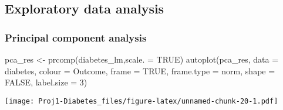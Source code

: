 \documentclass[
]{article}
\newenvironment{Shaded}{\begin{snugshade}}{\end{snugshade}}
\newcommand{\AttributeTok}[1]{\textcolor[rgb]{0.77,0.63,0.00}{#1}}
\newcommand{\ConstantTok}[1]{\textcolor[rgb]{0.00,0.00,0.00}{#1}}
\newcommand{\DecValTok}[1]{\textcolor[rgb]{0.00,0.00,0.81}{#1}}
\newcommand{\FunctionTok}[1]{\textcolor[rgb]{0.00,0.00,0.00}{#1}}
\newcommand{\NormalTok}[1]{#1}
\newcommand{\OtherTok}[1]{\textcolor[rgb]{0.56,0.35,0.01}{#1}}
\newcommand{\StringTok}[1]{\textcolor[rgb]{0.31,0.60,0.02}{#1}}
\begin{document}
\hypertarget{exploratory-data-analysis}{%
\subsection{Exploratory data analysis}\label{exploratory-data-analysis}}

\hypertarget{principal-component-analysis}{%
\subsubsection{Principal component
analysis}\label{principal-component-analysis}}

\begin{Shaded}
\begin{Highlighting}[]
\NormalTok{pca\_res }\OtherTok{\textless{}{-}} \FunctionTok{prcomp}\NormalTok{(diabetes\_lm,}\AttributeTok{scale. =} \ConstantTok{TRUE}\NormalTok{)}
\FunctionTok{autoplot}\NormalTok{(pca\_res, }\AttributeTok{data =}\NormalTok{ diabetes, }\AttributeTok{colour =} \StringTok{\textquotesingle{}Outcome\textquotesingle{}}\NormalTok{,}
         \AttributeTok{frame =} \ConstantTok{TRUE}\NormalTok{, }\AttributeTok{frame.type =} \StringTok{\textquotesingle{}norm\textquotesingle{}}\NormalTok{, }\AttributeTok{shape =} \ConstantTok{FALSE}\NormalTok{, }\AttributeTok{label.size =} \DecValTok{3}\NormalTok{)}
\end{Highlighting}
\end{Shaded}

\texttt{[image: Proj1-Diabetes\_files/figure-latex/unnamed-chunk-20-1.pdf]}
\end{document}

